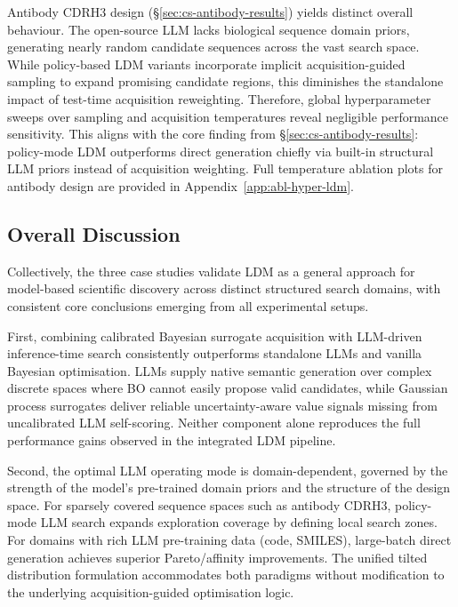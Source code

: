 Antibody CDRH3 design (\S\ref{sec:cs-antibody-results}) yields distinct overall behaviour. The open-source LLM lacks biological sequence domain priors, generating nearly random candidate sequences across the vast search space. While policy-based LDM variants incorporate implicit acquisition-guided sampling to expand promising candidate regions, this diminishes the standalone impact of test-time acquisition reweighting. Therefore, global hyperparameter sweeps over sampling and acquisition temperatures reveal negligible performance sensitivity. This aligns with the core finding from \S\ref{sec:cs-antibody-results}: policy-mode LDM outperforms direct generation chiefly via built-in structural LLM priors instead of acquisition weighting. Full temperature ablation plots for antibody design are provided in Appendix~\ref{app:abl-hyper-ldm}.

\subsection{Overall Discussion}
\label{sec:overall-discussion}

Collectively, the three case studies validate LDM as a general approach for model-based scientific discovery across distinct structured search domains, with consistent core conclusions emerging from all experimental setups.

First, combining calibrated Bayesian surrogate acquisition with LLM-driven inference-time search consistently outperforms standalone LLMs and vanilla Bayesian optimisation. LLMs supply native semantic generation over complex discrete spaces where BO cannot easily propose valid candidates, while Gaussian process surrogates deliver reliable uncertainty-aware value signals missing from uncalibrated LLM self-scoring. Neither component alone reproduces the full performance gains observed in the integrated LDM pipeline.

Second, the optimal LLM operating mode is domain-dependent, governed by the strength of the model’s pre-trained domain priors and the structure of the design space. For sparsely covered sequence spaces such as antibody CDRH3, policy-mode LLM search expands exploration coverage by defining local search zones. For domains with rich LLM pre-training data (code, SMILES), large-batch direct generation achieves superior Pareto/affinity improvements. The unified tilted distribution formulation accommodates both paradigms without modification to the underlying acquisition-guided optimisation logic.

